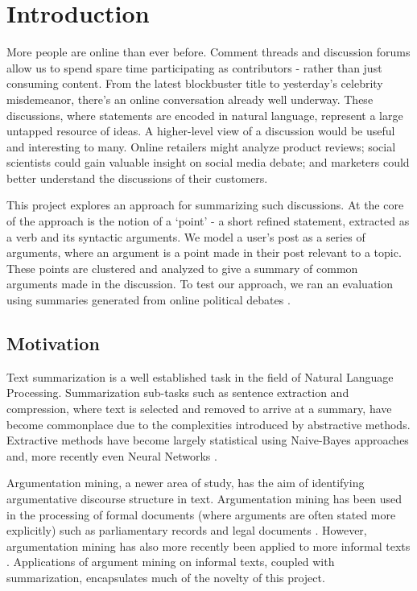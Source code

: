 \chapter{Introduction\label{chap:introduction}}
  More people are online than ever before. Comment threads and discussion forums allow us to spend spare time participating as contributors - rather than just consuming content. From the latest blockbuster title to yesterday's celebrity misdemeanor, there's an online conversation already well underway. These discussions, where statements are encoded in natural language, represent a large untapped resource of ideas. A higher-level view of a discussion would be useful and interesting to many. Online retailers might analyze product reviews; social scientists could gain valuable insight on social media debate; and marketers could better understand the discussions of their customers.

  This project explores an approach for summarizing such discussions. At the core of the approach is the notion of a `point' - a short refined statement, extracted as a verb and its syntactic arguments. We model a user's post as a series of arguments, where an argument is a point made in their post relevant to a topic. These points are clustered and analyzed to give a summary of common arguments made in the discussion. To test our approach, we ran an evaluation using summaries generated from online political debates \cite{walker2012corpus}.

  \section{Motivation}
    Text summarization is a well established task in the field of Natural Language Processing. Summarization sub-tasks such as sentence extraction and compression, where text is selected and removed to arrive at a summary, have become commonplace due to the complexities introduced by abstractive methods. Extractive methods have become largely statistical using Naive-Bayes \cite{kupiec1995trainable} approaches and, more recently even Neural Networks \cite{svore2007enhancing}.

    Argumentation mining, a newer area of study, has the aim of identifying argumentative discourse structure in text. Argumentation mining has been used in the processing of formal documents (where arguments are often stated more explicitly) such as parliamentary records \cite{palau2009argumentation} and legal documents \cite{montemagni2010semantic}. However, argumentation mining has also more recently been applied to more informal texts \cite{park2015conditional}. Applications of argument mining on informal texts, coupled with summarization, encapsulates much of the novelty of this project.

